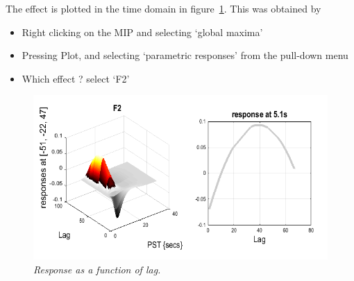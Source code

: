 \documentclass[a4paper,titlepage]{book}
\newcommand{\bi}{\begin{itemize}}
\newcommand{\ei}{\end{itemize}}
\begin{document}
The effect is plotted in the time domain in figure~\ref{famous_lag}. This was obtained by
\bi
\item{Right clicking on the MIP and selecting `global maxima'}
\item{Pressing Plot, and selecting `parametric responses' from the pull-down menu}
\item{Which effect ? select `F2'}
\ei
\begin{figure}
\begin{center}
\includegraphics[width=150mm]{famous_lag}
\caption{\em Response as a function of lag. \label{famous_lag} }
\end{center}
\end{figure}
\end{document}
